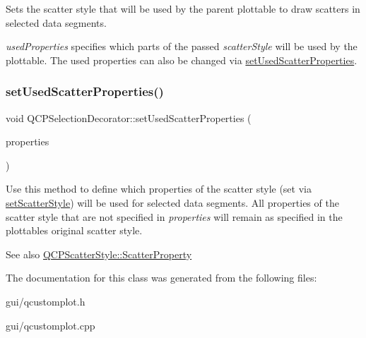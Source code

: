 Sets the scatter style that will be used by the parent plottable to draw scatters in selected data segments.

{\itshape used\+Properties} specifies which parts of the passed {\itshape scatter\+Style} will be used by the plottable. The used properties can also be changed via \hyperlink{classQCPSelectionDecorator_a808c1607cd4e83869c04986e332455c0}{set\+Used\+Scatter\+Properties}. \mbox{\label{classQCPSelectionDecorator_a808c1607cd4e83869c04986e332455c0}} 
\subsubsection{\texorpdfstring{set\+Used\+Scatter\+Properties()}{setUsedScatterProperties()}}
{\footnotesize\ttfamily void Q\+C\+P\+Selection\+Decorator\+::set\+Used\+Scatter\+Properties (\begin{DoxyParamCaption}\item[{const Q\+C\+P\+Scatter\+Style\+::\+Scatter\+Properties \&}]{properties }\end{DoxyParamCaption})}

Use this method to define which properties of the scatter style (set via \hyperlink{classQCPSelectionDecorator_ab403a613289714ff4fd4a0c0371ab116}{set\+Scatter\+Style}) will be used for selected data segments. All properties of the scatter style that are not specified in {\itshape properties} will remain as specified in the plottable\textquotesingle{}s original scatter style.

\begin{DoxySeeAlso}{See also}
\hyperlink{classQCPScatterStyle_a8974f6a20f8f6eea7781f0e6af9deb46}{Q\+C\+P\+Scatter\+Style\+::\+Scatter\+Property} 
\end{DoxySeeAlso}


The documentation for this class was generated from the following files\+:\begin{DoxyCompactItemize}
\item 
gui/qcustomplot.\+h\item 
gui/qcustomplot.\+cpp\end{DoxyCompactItemize}
